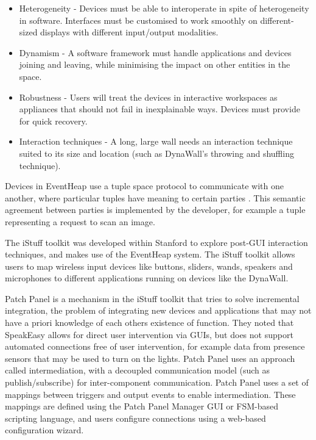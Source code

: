 \begin{itemize}
	\item Heterogeneity - Devices must be able to interoperate in spite of heterogeneity in software. Interfaces must be customised to work smoothly on different-sized displays with different input/output modalities.
	\item Dynamism - A software framework must handle applications and devices joining and leaving, while minimising the impact on other entities in the space.
	\item Robustness - Users will treat the devices in interactive workspaces as appliances that should not fail in inexplainable ways. Devices must provide for quick recovery.
	\item Interaction techniques - A long, large wall needs an interaction technique suited to its size and location (such as DynaWall's throwing and shuffling technique).
\end{itemize}

Devices in EventHeap use a tuple space protocol to communicate with one another, where particular tuples have meaning to certain parties \cite{Edwards2001}. This semantic agreement between parties is implemented by the developer, for example a tuple representing a request to scan an image.

The iStuff toolkit \cite{Ballagas2003} was developed within Stanford to explore post-\ac{GUI} interaction techniques, and makes use of the EventHeap system. The iStuff toolkit allows users to map wireless input devices like buttons, sliders, wands, speakers and microphones to different applications running on devices like the DynaWall.


Patch Panel \cite{Ballagas2004} is a mechanism in the iStuff toolkit that tries to solve incremental integration, the problem of integrating new devices and applications that may not have a priori knowledge of each others existence of function. They noted that SpeakEasy allows for direct user intervention via \acp{GUI}, but does not support automated connections free of user intervention, for example data from presence sensors that may be used to turn on the lights. Patch Panel uses an approach called intermediation, with a decoupled communication model (such as publish/subscribe) for inter-component communication.  Patch Panel uses a set of mappings between triggers and output events to enable intermediation. These mappings are defined using the Patch Panel Manager \ac{GUI} or \ac{FSM}-based scripting language, and users configure connections using a web-based configuration wizard.

